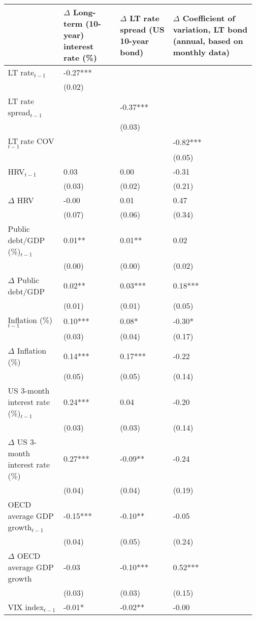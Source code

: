 {\tiny
\begin{tabular}{lp{2cm}p{2cm}p{2cm}}
  \hline
 & $\Delta$ Long-term (10-year) interest rate (\%) & $\Delta$ LT rate spread (US 10-year bond) & $\Delta$ Coefficient of variation, LT bond (annual, based on monthly data) \\ 
  \hline
LT rate$_{t-1}$ & -0.27*** &  &  \\ 
   & (0.02) &  &  \\ 
  LT rate spread$_{t-1}$ &  & -0.37*** &  \\ 
   &  & (0.03) &  \\ 
  LT rate COV$_{t-1}$ &  &  & -0.82*** \\ 
   &  &  & (0.05) \\ 
  HRV$_{t-1}$ & 0.03 & 0.00 & -0.31 \\ 
   & (0.03) & (0.02) & (0.21) \\ 
  $\Delta$ HRV & -0.00 & 0.01 & 0.47 \\ 
   & (0.07) & (0.06) & (0.34) \\ 
  Public debt/GDP (\%)$_{t-1}$ & 0.01** & 0.01** & 0.02 \\ 
   & (0.00) & (0.00) & (0.02) \\ 
  $\Delta$ Public debt/GDP & 0.02** & 0.03*** & 0.18*** \\ 
   & (0.01) & (0.01) & (0.05) \\ 
  Inflation (\%) $_{t-1}$ & 0.10*** & 0.08* & -0.30* \\ 
   & (0.03) & (0.04) & (0.17) \\ 
  $\Delta$ Inflation (\%) & 0.14*** & 0.17*** & -0.22 \\ 
   & (0.05) & (0.05) & (0.14) \\ 
  US 3-month interest rate (\%)$_{t-1}$ & 0.24*** & 0.04 & -0.20 \\ 
   & (0.03) & (0.03) & (0.14) \\ 
  $\Delta$ US 3-month interest rate (\%) & 0.27*** & -0.09** & -0.24 \\ 
   & (0.04) & (0.04) & (0.19) \\ 
  OECD average GDP growth$_{t-1}$ & -0.15*** & -0.10** & -0.05 \\ 
   & (0.04) & (0.05) & (0.24) \\ 
  $\Delta$ OECD average GDP growth & -0.03 & -0.10*** & 0.52*** \\ 
   & (0.03) & (0.03) & (0.15) \\ 
  VIX index$_{t-1}$ & -0.01* & -0.02** & -0.00 \\ 

\end{tabular}}

